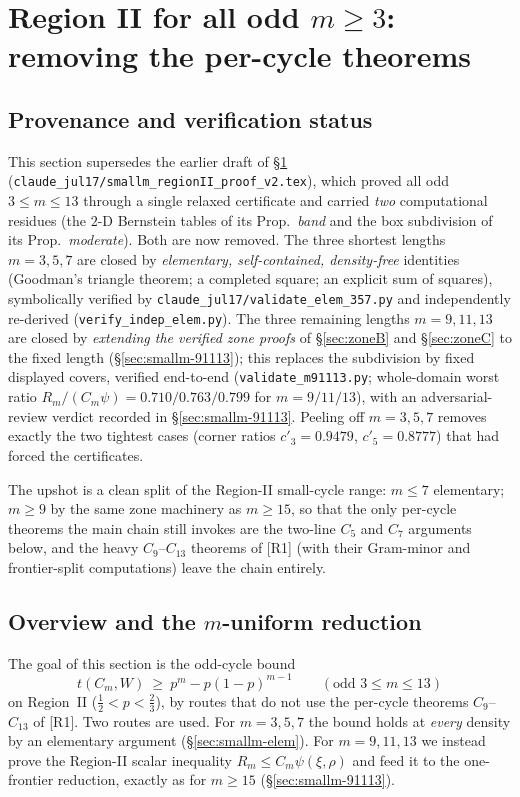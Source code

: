 \documentclass[11pt]{article}
\theoremstyle{remark}
\theoremstyle{plain}
\theoremstyle{plain}
\begin{document}
\section{Region II for all odd $m\ge3$: removing the per-cycle theorems}\label{sec:smallm}

\subsection*{Provenance and verification status}
This section supersedes the earlier draft of \S\ref{sec:smallm}
(\texttt{claude\_jul17/smallm\_regionII\_proof\_v2.tex}), which proved all odd
$3\le m\le13$ through a single relaxed certificate and carried \emph{two}
computational residues (the $2$-D Bernstein tables of its Prop.~\emph{band} and
the box subdivision of its Prop.~\emph{moderate}).  Both are now removed.  The
three shortest lengths $m=3,5,7$ are closed by \emph{elementary, self-contained,
density-free} identities (Goodman's triangle theorem; a completed square; an
explicit sum of squares), symbolically verified by
\texttt{claude\_jul17/validate\_elem\_357.py} and independently re-derived
(\texttt{verify\_indep\_elem.py}).  The three remaining lengths $m=9,11,13$ are
closed by \emph{extending the verified zone proofs} of \S\ref{sec:zoneB} and
\S\ref{sec:zoneC} to the fixed length (\S\ref{sec:smallm-91113}); this replaces
the subdivision by fixed displayed covers, verified end-to-end
(\texttt{validate\_m91113.py}; whole-domain worst ratio
$R_m/(C_m\psi)=0.710/0.763/0.799$ for $m=9/11/13$), with an adversarial-review
verdict recorded in \S\ref{sec:smallm-91113}.  Peeling off $m=3,5,7$ removes
exactly the two tightest cases (corner ratios $c'_3=0.9479$, $c'_5=0.8777$) that
had forced the certificates.

The upshot is a clean split of the Region-II small-cycle range: $m\le7$
elementary; $m\ge9$ by the same zone machinery as $m\ge15$, so that the only
per-cycle theorems the main chain still invokes are the two-line $C_5$ and $C_7$
arguments below, and the heavy $C_9$--$C_{13}$ theorems of [R1] (with their
Gram-minor and frontier-split computations) leave the chain entirely.

\subsection{Overview and the \texorpdfstring{$m$}{m}-uniform reduction}\label{sec:smallm-intro}

The goal of this section is the odd-cycle bound
\begin{equation}\label{eq:smallm-target}
        t(C_m,W)\ \ge\ p^m-p(1-p)^{m-1}\qquad(\text{odd }3\le m\le13)
\end{equation}
on Region~II ($\tfrac12<p<\tfrac23$), by routes that do not use the per-cycle
theorems $C_9$--$C_{13}$ of [R1].  Two routes are used.  For $m=3,5,7$ the bound
holds at \emph{every} density by an elementary argument
(\S\ref{sec:smallm-elem}).  For $m=9,11,13$ we instead prove the Region-II
scalar inequality $R_m\le C_m\psi(\xi,\rho)$ and feed it to the one-frontier
reduction, exactly as for $m\ge15$ (\S\ref{sec:smallm-91113}).
\end{document}
